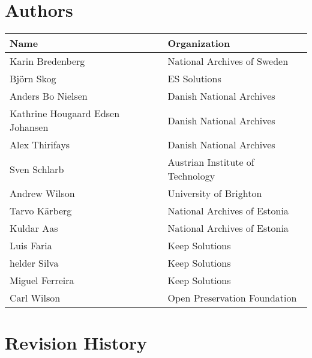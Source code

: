 \pagebreak

\section*{Authors}

\begin{tabular}{|p{6cm}|p{9cm}|}
\hline
\textbf{Name}     & \textbf{Organization}            \\
\hline
Karin Bredenberg  & National Archives of Sweden      \\
\hline
Björn Skog        & ES Solutions      \\
\hline
Anders Bo Nielsen & Danish National Archives         \\
\hline
Kathrine Hougaard Edsen Johansen & Danish National Archives         \\
\hline
Alex Thirifays    & Danish National Archives         \\
\hline
Sven Schlarb      & Austrian Institute of Technology \\
\hline
Andrew Wilson     & University of Brighton           \\
\hline
Tarvo Kärberg     & National Archives of Estonia     \\
\hline
Kuldar Aas        & National Archives of Estonia     \\
\hline
Luis Faria        & Keep Solutions                   \\
\hline
helder Silva      & Keep Solutions                   \\
\hline
Miguel Ferreira   & Keep Solutions                   \\
\hline
Carl Wilson       & Open Preservation Foundation    \\
\hline
\end{tabular}


\pagebreak

\section*{Revision History}

